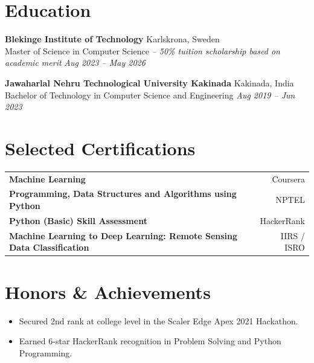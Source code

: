 \documentclass[10pt,a4paper]{article}
\newcommand{\educationHeading}[4]{
    \textbf{#1} \hfill #2\\
    #3 \hfill \textit{#4}
    \vspace{2pt}
}
\begin{document}
\section{Education}

\educationHeading
{Blekinge Institute of Technology}
{Karlskrona, Sweden}
{Master of Science in Computer Science \textit{-- 50\% tuition scholarship based on academic merit}}
{Aug 2023 -- May 2026}

\vspace{3pt}

\educationHeading
{Jawaharlal Nehru Technological University Kakinada}
{Kakinada, India}
{Bachelor of Technology in Computer Science and Engineering}
{Aug 2019 -- Jun 2023}

\section{Selected Certifications}
\begin{tabularx}{\textwidth}{X r}
\textbf{Machine Learning} & Coursera \\
\textbf{Programming, Data Structures and Algorithms using Python} & NPTEL \\
\textbf{Python (Basic) Skill Assessment} & HackerRank \\
\textbf{Machine Learning to Deep Learning: Remote Sensing Data Classification} & IIRS / ISRO \\
\end{tabularx}

\section{Honors \& Achievements}
\begin{itemize}
    \item Secured 2nd rank at college level in the Scaler Edge Apex 2021 Hackathon.
    \item Earned 6-star HackerRank recognition in Problem Solving and Python Programming.
\end{itemize}
\end{document}
